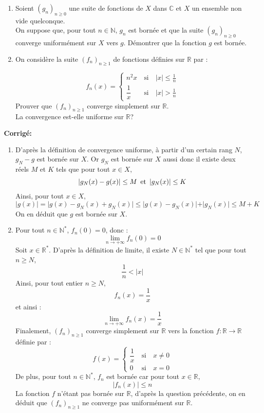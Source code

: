 \documentclass[a4paper,twoside,french,11pt]{VcCours}
\newcommand{\corr}{\textbf{Corrigé:}}
\begin{document}
\medskip
\begin{Exercice}{} 
\begin{enumerate}

\item Soient $(g_n)_{n \geq 0}$ une suite de fonctions de $X$ dans $\mathbb{C}$ et $X$ un ensemble non vide quelconque.\\
On suppose que, pour tout $n\in \mathbb{N}$, $g_n$ est bornée et que la suite $(g_n)_{n \geq 0}$ converge uniformément sur $X$ vers $g$. Démontrer que la fonction  $g$ est bornée.
\item
On considère la suite  $(f_n)_{n \geq 1}$ de fonctions  définies sur $\mathbb{R}$ par : 

$$f_n(x)=\left\lbrace \begin{array}{lll}
n^2x&\:\text{si}\:&|x|\leq \frac{1}{n}\\[0.3cm]
\dfrac{1}{x}&\:\text{si}\:&|x|>\frac{1}{n}
\end{array}\right.$$
Prouver que $(f_n)_{n \geq 1}$  converge simplement sur $\mathbb{R}$.\\
La convergence est-elle uniforme sur $\mathbb{R}$?

\end{enumerate}
\end{Exercice}

\newpage

\corr \begin{enumerate}

\item D'après la définition de convergence uniforme, à partir d'un certain rang $N$, $g_N-g$ est bornée sur $X$. Or $g_N$ est bornée sur $X$ aussi donc il existe deux réels $M$ et $K$ tels que pour tout $x \in X$,
$$ \vert g_N(x)-g(x) \vert \leq M \, \hbox{ et } \,  \vert g_N(x) \vert \leq K$$
Ainsi, pour tout $x \in X$,
$$ \vert g(x) \vert = \vert g(x)-g_N(x) + g_N(x) \vert \leq \vert g(x)-g_N(x) \vert + \vert g_N(x) \vert \leq M+K$$
On en déduit que $g$ est bornée sur $X$.
\item Pour tout $n\in\mathbb{N}^*$, $f_n(0)=0$, donc :
$$\lim\limits_{n\to +\infty}f_n(0)=0$$
Soit $x\in\mathbb{R}^*$. D'après la définition de limite, il existe $N \in \mathbb{N}^*$ tel que pour tout $n \geq N$,
$$ \dfrac{1}{n}<|x|$$
Ainsi, pour tout entier $n \geq N$,
$$ f_n(x)=\dfrac{1}{x}$$
et ainsi :
$$\lim\limits_{n\to +\infty}^{}f_n(x)=\dfrac{1}{x}$$
Finalement, $(f_n)_{n \geq 1}$  converge simplement sur $\mathbb{R}$ vers la fonction $f : \mathbb{R} \rightarrow \mathbb{R}$ définie par :
$$f(x)=\left\lbrace \begin{array}{lll}
\dfrac{1}{x}&\:\text{si}\:&x\neq 0\\[0.3cm]
0&\:\text{si}\:&x=0
\end{array}\right. $$
De plus, pour tout $n\in\mathbb{N}^*$, $f_n$ est bornée car pour tout $x \in \mathbb{R}$,
$$|f_n(x)|\leq n$$
La fonction $f$ n'étant pas bornée sur $\mathbb{R}$, d'après la question précédente,  on en déduit que $(f_n)_{n \geq 1}$  ne converge pas uniformément sur $\mathbb{R}$.
\end{enumerate}
\end{document}

